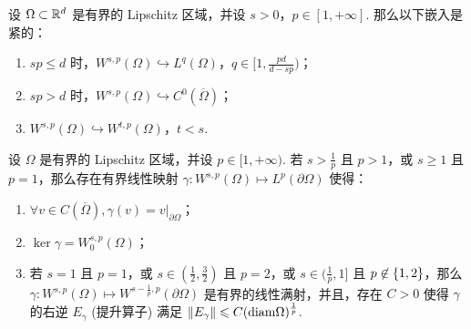 \begin{theorem}\label{thm: compact embeddings}
	设 \(\Omega \subset \mathbb{R}^{d}\) 是有界的 Lipschitz 区域，并设 \(s > 0\)，\(p \in [1, +\infty]\). 那么以下嵌入是紧的：
	\begin{enumerate}
		\item \(s p \leqslant d\) 时，\(W^{s, p}(\Omega) \hookrightarrow L^{q}(\Omega)\)，\(q \in [1, \frac{p d}{d - sp})\)；
		\item \(s p > d\) 时，\(W^{s, p}(\Omega) \hookrightarrow C^{0}(\overline{\Omega})\)；
		\item \(W^{s, p}(\Omega) \hookrightarrow W^{t, p}(\Omega)\)，\(t < s\).
	\end{enumerate}
\end{theorem}

\begin{theorem}\label{thm: trace theorem}
	设 \(\Omega\) 是有界的 Lipschitz 区域，并设 \(p \in [1, +\infty)\). 若 \(s > \frac{1}{p}\) 且 \(p > 1\)，或 \(s \geqslant 1\) 且 \(p = 1\)，那么存在有界线性映射 \(\gamma: W^{s,p}(\Omega) \mapsto L^{p}(\partial \Omega)\) 使得：
	\begin{enumerate}
		\item \(\forall v \in C(\overline{\Omega}), \gamma(v) = v\big|_{\partial \Omega}\)；
		\item \(\ker\gamma = W^{s,p}_{0}(\Omega)\)；
		\item 若 \(s = 1\) 且 \(p = 1\)，或 \(s \in (\frac{1}{2}, \frac{3}{2})\) 且 \(p = 2\)，或 \(s \in (\frac{1}{p}, 1]\) 且 \(p \not\in \left\{1,2\right\}\)，那么 \(\gamma: W^{s,p}(\Omega) \mapsto W^{s-\frac{1}{p}, p}(\partial \Omega)\) 是有界的线性满射，并且，存在 \(C > 0\) 使得 \(\gamma\) 的右逆 \(E_{\gamma}\) (提升算子) 满足 \(\left\lVert E_{\gamma}\right\rVert \leqslant C (\mathrm{diam} \Omega)^{\frac{1}{p}}\).
	\end{enumerate}
\end{theorem}

